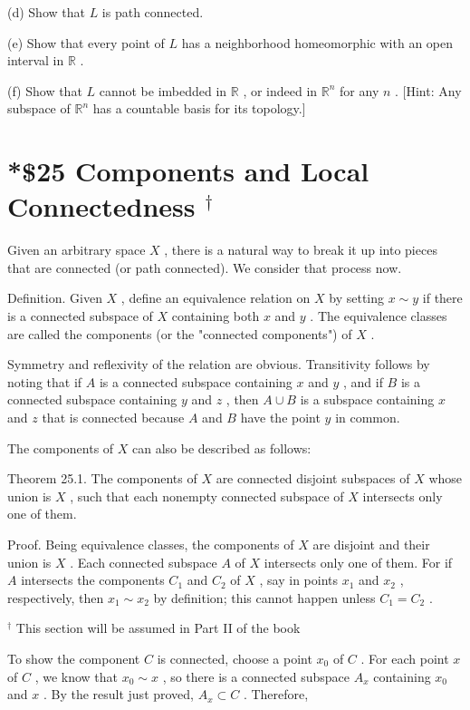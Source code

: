 (d) Show that \(L\) is path connected.

(e) Show that every point of \(L\) has a neighborhood homeomorphic with an open interval in \(\mathbb{R}\) .

(f) Show that \(L\) cannot be imbedded in \(\mathbb{R}\) , or indeed in \({\mathbb{R}}^{n}\) for any \(n\) . [Hint: Any subspace of \({\mathbb{R}}^{n}\) has a countable basis for its topology.]

\section*{*\$25 Components and Local Connectedness \({}^{ \dagger  }\)}

Given an arbitrary space \(X\) , there is a natural way to break it up into pieces that are connected (or path connected). We consider that process now.

Definition. Given \(X\) , define an equivalence relation on \(X\) by setting \(x \sim  y\) if there is a connected subspace of \(X\) containing both \(x\) and \(y\) . The equivalence classes are called the components (or the "connected components") of \(X\) .

Symmetry and reflexivity of the relation are obvious. Transitivity follows by noting that if \(A\) is a connected subspace containing \(x\) and \(y\) , and if \(B\) is a connected subspace containing \(y\) and \(z\) , then \(A \cup  B\) is a subspace containing \(x\) and \(z\) that is connected because \(A\) and \(B\) have the point \(y\) in common.

The components of \(X\) can also be described as follows:

Theorem 25.1. The components of \(X\) are connected disjoint subspaces of \(X\) whose union is \(X\) , such that each nonempty connected subspace of \(X\) intersects only one of them.

Proof. Being equivalence classes, the components of \(X\) are disjoint and their union is \(X\) . Each connected subspace \(A\) of \(X\) intersects only one of them. For if \(A\) intersects the components \({C}_{1}\) and \({C}_{2}\) of \(X\) , say in points \({x}_{1}\) and \({x}_{2}\) , respectively, then \({x}_{1} \sim  {x}_{2}\) by definition; this cannot happen unless \({C}_{1} = {C}_{2}\) .

\customfootnote
{
\({}^{ \dagger  }\) This section will be assumed in Part II of the book
}

To show the component \(C\) is connected, choose a point \({x}_{0}\) of \(C\) . For each point \(x\) of \(C\) , we know that \({x}_{0} \sim  x\) , so there is a connected subspace \({A}_{x}\) containing \({x}_{0}\) and \(x\) . By the result just proved, \({A}_{x} \subset  C\) . Therefore,

